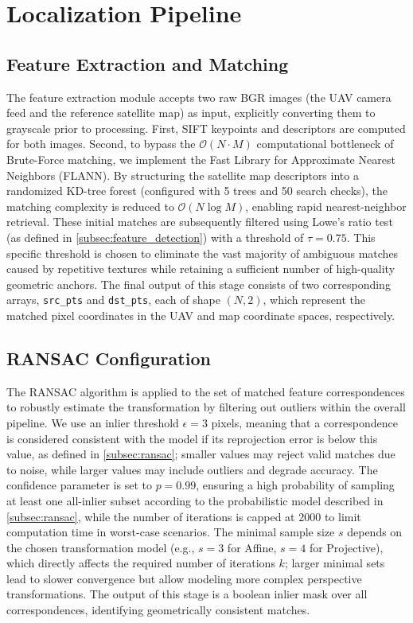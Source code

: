 \section{Localization Pipeline}\label{sec:localization_pipeline}

\subsection{Feature Extraction and Matching}\label{subsec:pipeline_feature_extraction}
The feature extraction module accepts two raw BGR images (the UAV camera feed and the reference satellite map) as input, explicitly converting them to grayscale prior to processing. First, SIFT keypoints and descriptors are computed for both images. Second, to bypass the $\mathcal{O}(N \cdot M)$ computational bottleneck of Brute-Force matching, we implement the Fast Library for Approximate Nearest Neighbors (FLANN). By structuring the satellite map descriptors into a randomized KD-tree forest (configured with 5 trees and 50 search checks), the matching complexity is reduced to $\mathcal{O}(N \log M)$, enabling rapid nearest-neighbor retrieval.  These initial matches are subsequently filtered using Lowe's ratio test (as defined in \autoref{subsec:feature_detection}) with a threshold of $\tau = 0.75$. This specific threshold is chosen to eliminate the vast majority of ambiguous matches caused by repetitive textures while retaining a sufficient number of high-quality geometric anchors. The final output of this stage consists of two corresponding arrays, \texttt{src\_pts} and \texttt{dst\_pts}, each of shape $(N, 2)$, which represent the matched pixel coordinates in the UAV and map coordinate spaces, respectively.

\subsection{RANSAC Configuration}\label{subsec:pipeline_ransac}
The RANSAC algorithm is applied to the set of matched feature correspondences to robustly estimate the transformation by filtering out outliers within the overall pipeline. We use an inlier threshold $\epsilon = 3$ pixels, meaning that a correspondence is considered consistent with the model if its reprojection error is below this value, as defined in \autoref{subsec:ransac}; smaller values may reject valid matches due to noise, while larger values may include outliers and degrade accuracy. The confidence parameter is set to $p = 0.99$, ensuring a high probability of sampling at least one all-inlier subset according to the probabilistic model described in \autoref{subsec:ransac}, while the number of iterations is capped at $2000$ to limit computation time in worst-case scenarios. The minimal sample size $s$ depends on the chosen transformation model (e.g., $s = 3$ for Affine, $s = 4$ for Projective), which directly affects the required number of iterations $k$; larger minimal sets lead to slower convergence but allow modeling more complex perspective transformations. The output of this stage is a boolean inlier mask over all correspondences, identifying geometrically consistent matches.

